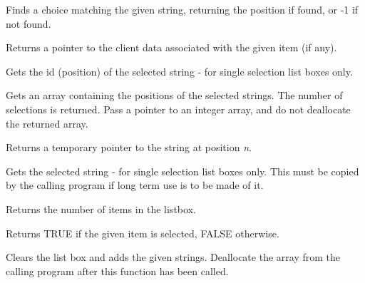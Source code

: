 
Finds a choice matching the given string, returning the position if found, or
-1 if not found.



Returns a pointer to the client data associated with the given item (if any).



Gets the id (position) of the selected string - for single selection list boxes only.



Gets an array containing the positions of the selected strings. The number of selections
is returned.  Pass a pointer to an integer array, and do not deallocate the returned array.



Returns a temporary pointer to the string at position {\it n}.



Gets the selected string - for single selection list boxes only. This
must be copied by the calling program if long term use is to be made of
it.



Returns the number of items in the listbox.



Returns TRUE if the given item is selected, FALSE otherwise.



Clears the list box and adds the given strings. Deallocate the array from the calling program
after this function has been called.

